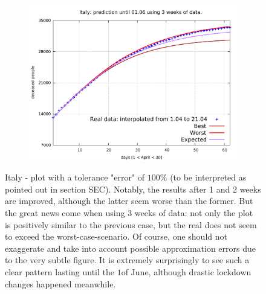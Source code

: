 \documentclass[8pt]{article}
\begin{document}
\begin{figure}[h!]
\begin{subfigure}[b]{0.45\linewidth}
  \includegraphics[width=\linewidth]{../err100p_simulations/it/1-21/1-21.pdf}
  \end{subfigure}
	\caption{Italy - plot with a tolerance "error" of $100\%$ (to be
	interpreted as pointed out in section SEC). Notably, the results
	after 1 and 2 weeks are improved, although the latter seem
	worse than the former. But the great news come when using 3
	weeks of data: not only the plot is positively similar to the previous
	case, but the real does not seem to exceed the worst-case-scenario.
	Of course, one should not exaggerate and take into account possible
	approximation errors due to the very subtle figure.
	It is extremely surprisingly to see such a clear pattern
	lasting until the $1$of June, although drastic lockdown
	changes happened meanwhile.}
\end{figure}
\end{document}
